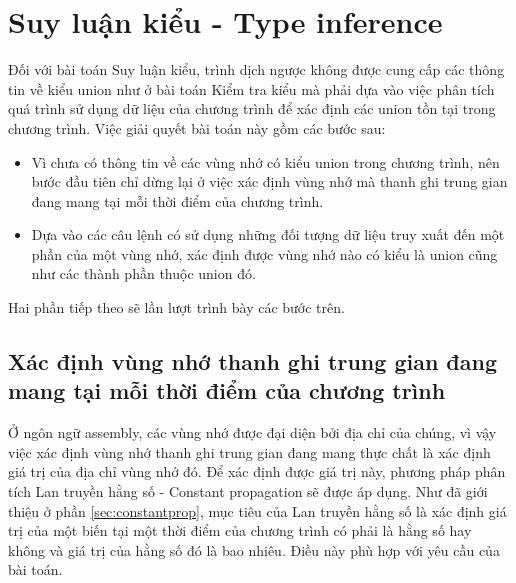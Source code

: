 \chapter{Suy luận kiểu - Type inference}

Đối với bài toán Suy luận kiểu, trình dịch ngược không được cung cấp các thông tin về kiểu union như ở bài toán Kiểm tra kiểu mà phải dựa vào việc phân tích quá trình sử dụng dữ liệu của chương trình để xác định các union tồn tại trong chương trình. Việc giải quyết bài toán này gồm các bước sau:

\begin{itemize}
	\item Vì chưa có thông tin về các vùng nhớ có kiểu union trong chương trình, nên bước đầu tiên chỉ dừng lại ở việc xác định vùng nhớ mà thanh ghi trung gian đang mang tại mỗi thời điểm của chương trình.
	\item Dựa vào các câu lệnh có sử dụng những đối tượng dữ liệu truy xuất đến một phần của một vùng nhớ, xác định được vùng nhớ nào có kiểu là union cũng như các thành phần thuộc union đó.
\end{itemize}

Hai phần tiếp theo sẽ lần lượt trình bày các bước trên.

\section{Xác định vùng nhớ thanh ghi trung gian đang mang tại mỗi thời điểm của chương trình}

Ở ngôn ngữ assembly, các vùng nhớ được đại diện bởi địa chỉ của chúng, vì vậy việc xác định vùng nhớ thanh ghi trung gian đang mang thực chất là xác định giá trị của địa chỉ vùng nhớ đó. Để xác định được giá trị này, phương pháp phân tích Lan truyền hằng số - Constant propagation sẽ được áp dụng. Như đã giới thiệu ở phần \ref{sec:constantprop}, mục tiêu của Lan truyền hằng số là xác định giá trị của một biến tại một thời điểm của chương trình có phải là hằng số hay không và giá trị của hằng số đó là bao nhiêu. Điều này phù hợp với yêu cầu của bài toán.

